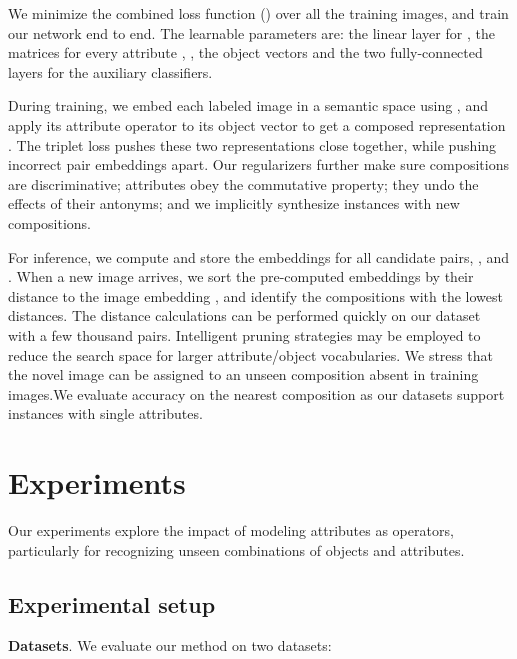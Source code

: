 \documentclass[runningheads]{llncs}
\begin{document}
We minimize the combined loss function () over all the training images, and train our network end to end. The learnable parameters are: the linear layer for , the matrices for every attribute , , the object vectors  and the two fully-connected layers for the auxiliary classifiers.

During training, we embed each labeled image  in a semantic space using , and apply its attribute operator  to its object vector  to get a composed representation .  The triplet loss pushes these two representations close together, while pushing incorrect pair embeddings apart. Our regularizers further make sure compositions are discriminative; attributes obey the commutative property; they undo the effects of their antonyms; and we implicitly synthesize instances with new compositions. 

For inference, we compute and store the embeddings for all candidate pairs, ,  and . When a new image  arrives, we sort the pre-computed embeddings by their distance to the image embedding , and identify the compositions with the lowest distances. The distance calculations can be performed quickly on our dataset with a few thousand pairs. Intelligent pruning strategies may be employed to reduce the search space for larger attribute/object vocabularies. We stress that the novel image can be assigned to an unseen composition absent in training images.We evaluate accuracy on the nearest composition  as our datasets support instances with single attributes.  \vspace*{-0.1in}
\section{Experiments}\label{sec:results}

Our experiments explore the impact of modeling attributes as operators, particularly for recognizing unseen combinations of objects and attributes.

\vspace*{-0.1in}
\subsection{Experimental setup}

\noindent\textbf{Datasets}. We evaluate our method on two datasets:
\end{document}
